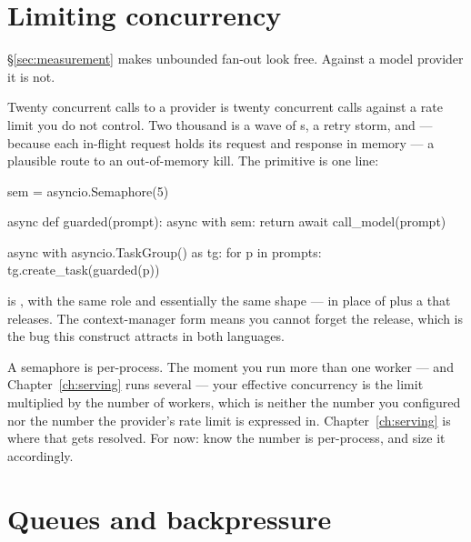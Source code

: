 \section{Limiting concurrency}
\label{sec:semaphore}

\S\ref{sec:measurement} makes unbounded fan-out look free. Against a model
provider it is not.

Twenty concurrent calls to a provider is twenty concurrent calls against a rate
limit you do not control. Two thousand is a wave of s, a retry storm,
and --- because each in-flight request holds its request and response in memory
--- a plausible route to an out-of-memory kill. The primitive is one line:

\begin{python}[caption={Capping concurrency}, label={lst:semaphore}]
sem = asyncio.Semaphore(5)


async def guarded(prompt):
    async with sem:
        return await call_model(prompt)


async with asyncio.TaskGroup() as tg:
    for p in prompts:
        tg.create_task(guarded(p))
\end{python}

\begin{dotnetbox}
 is , with the same role and
essentially the same shape ---  in place of
 plus a  that releases. The context-manager
form means you cannot forget the release, which is the bug this construct
attracts in both languages.
\end{dotnetbox}

\begin{warning}
A semaphore is per-process. The moment you run more than one worker --- and
Chapter~\ref{ch:serving} runs several --- your effective concurrency is the
limit multiplied by the number of workers, which is neither the number you
configured nor the number the provider's rate limit is expressed in.
Chapter~\ref{ch:serving} is where that gets resolved. For now: know the number is
per-process, and size it accordingly.
\end{warning}

\section{Queues and backpressure}
\label{sec:queues}

